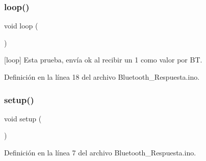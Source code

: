 \subsubsection{\texorpdfstring{loop()}{loop()}}
{\footnotesize\ttfamily void loop (\begin{DoxyParamCaption}{ }\end{DoxyParamCaption})}

\mbox{[}loop\mbox{]} Esta prueba, envía ok al recibir un 1 como valor por BT. 

Definición en la línea 18 del archivo Bluetooth\+\_\+\+Respuesta.\+ino.

\mbox{\label{_bluetooth___respuesta_8ino_a4fc01d736fe50cf5b977f755b675f11d}} 
\subsubsection{\texorpdfstring{setup()}{setup()}}
{\footnotesize\ttfamily void setup (\begin{DoxyParamCaption}{ }\end{DoxyParamCaption})}



Definición en la línea 7 del archivo Bluetooth\+\_\+\+Respuesta.\+ino.

